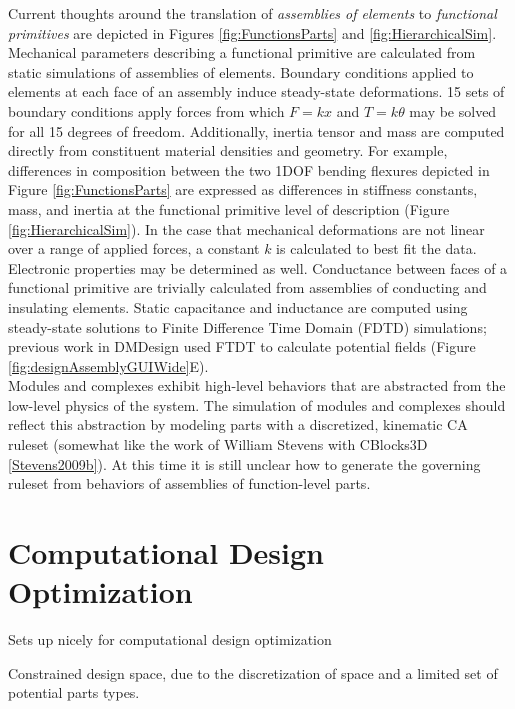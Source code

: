 {Current thoughts around the translation of \textit{assemblies of elements} to \textit{functional primitives} are depicted in Figures \ref{fig:FunctionsParts} and \ref{fig:HierarchicalSim}.  Mechanical parameters describing a functional primitive are calculated from static simulations of assemblies of elements.  Boundary conditions applied to elements at each face of an assembly induce steady-state deformations.  15 sets of boundary conditions apply forces from which $F = kx$ and $T = k\theta$ may be solved for all 15 degrees of freedom.  Additionally, inertia tensor and mass are computed directly from constituent material densities and geometry.  For example, differences in composition between the two 1DOF bending flexures depicted in Figure \ref{fig:FunctionsParts} are expressed as differences in stiffness constants, mass, and inertia at the functional primitive level of description (Figure \ref{fig:HierarchicalSim}).  In the case that mechanical deformations are not linear over a range of applied forces, a constant $k$ is calculated to best fit the data.  \\

Electronic properties may be determined as well.  Conductance between faces of a functional primitive are trivially calculated from assemblies of conducting and insulating elements.  Static capacitance and inductance are computed using steady-state solutions to Finite Difference Time Domain (FDTD) simulations; previous work in DMDesign used FTDT to calculate potential fields (Figure \ref{fig:designAssemblyGUIWide}E).\\

Modules and complexes exhibit high-level behaviors that are abstracted from the low-level physics of the system.  The simulation of modules and complexes should reflect this abstraction by modeling parts with a discretized, kinematic CA ruleset (somewhat like the work of William Stevens with CBlocks3D \ref{Stevens2009b}).  At this time it is still unclear how to generate the governing ruleset from behaviors of assemblies of function-level parts.

\section{Computational Design Optimization}

Sets up nicely for computational design optimization

Constrained design space, due to the discretization of space and a limited set of potential parts types.

}
